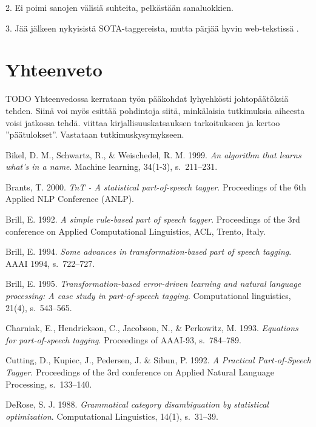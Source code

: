 \documentclass[utf8,bachelor,manualbib]{gradu3}
\begin{document}
2. Ei poimi sanojen välisiä suhteita, pelkästään sanaluokkien.

3. Jää jälkeen nykyisistä SOTA-taggereista, mutta pärjää hyvin web-tekstissä \citep{giesbrecht2009}.

\chapter{Yhteenveto}

TODO Yhteenvedossa kerrataan työn pääkohdat lyhyehkösti johtopäätöksiä tehden. Siinä voi myös esittää pohdintoja siitä, minkälaisia tutkimuksia aiheesta voisi jatkossa tehdä. viittaa kirjallisuuskatsauksen tarkoitukseen ja kertoo ''päätulokset''. Vastataan tutkimuskysymykseen.




\begin{thebibliography}{}

Bikel, D. M., Schwartz, R., \& Weischedel, R. M. 1999. \textit{An algorithm that learns what's in a name}. Machine learning, 34(1-3), s.~211--231.

Brants, T. 2000. \textit{TnT - A statistical part-of-speech tagger}. Proceedings of the 6th Applied NLP Conference (ANLP).

Brill, E. 1992. \textit{A simple rule-based part of speech tagger}. Proceedings of the 3rd conference on Applied Computational Linguistics, ACL, Trento, Italy.

Brill, E. 1994. \textit{Some advances in transformation-based part of speech tagging}. AAAI 1994, s.~722--727.

Brill, E. 1995. \textit{Transformation-based error-driven learning and natural language processing: A case study in part-of-speech tagging}. Computational linguistics, 21(4), s.~543--565.

Charniak, E., Hendrickson, C., Jacobson, N., \& Perkowitz, M. 1993. \textit{Equations for part-of-speech tagging}. Proceedings of AAAI-93, s.~784--789.

Cutting, D., Kupiec, J., Pedersen, J. \& Sibun, P. 1992. \textit{A Practical Part-of-Speech Tagger}. Proceedings of the 3rd conference on Applied Natural Language Processing, s.~133--140.

DeRose, S. J. 1988. \textit{Grammatical category disambiguation by statistical optimization}. Computational Linguistics, 14(1), s.~31--39.


\end{thebibliography}
\end{document}
